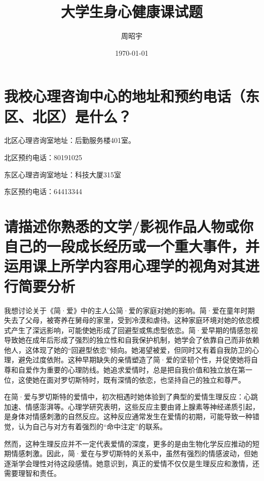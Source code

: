 \documentclass{ctexart}
\begin{document}
\title{大学生身心健康课试题}
\author{周昭宇}
\date{\today}

\pagestyle{empty}

\begin{titlepage}
    \maketitle
\end{titlepage}

\tableofcontents

\newpage

\section{我校心理咨询中心的地址和预约电话（东区、北区）是什么？}
北区心理咨询室地址：后勤服务楼401室。\par
北区预约电话：80191025\par
东区心理咨询室地址：科技大厦315室\par
东区预约电话：64413344\par

\section{请描述你熟悉的文学/影视作品人物或你自己的一段成长经历或一个重大事件，并运用课上所学内容用心理学的视角对其进行简要分析}
我想讨论关于《简·爱》中的主人公简·爱的家庭对她的影响。简·爱在童年时期失去了父母，被寄养在舅母的家里，受到冷漠和虐待。这种家庭环境对她的依恋模式产生了深远影响，可能使她形成了回避型或焦虑型依恋。简·爱早期的情感忽视导致她在成年后形成了强烈的独立性和自我保护机制，她学会了依靠自己而非依赖他人，这体现了她的“回避型依恋”倾向。她渴望被爱，但同时又有着自我防卫的心理，避免过度依附。这种早期缺失的亲情塑造了简·爱的坚韧个性，并促使她将自尊和自爱作为重要的心理防线。她追求爱情时，总是把自我价值和独立放在第一位，这使她在面对罗切斯特时，既有深情的依恋，也坚持自己的独立和尊严。\par
在简·爱与罗切斯特的爱情中，初次相遇时她体验到了典型的爱情生理反应：心跳加速、情感澎湃等。心理学研究表明，这些反应主要由肾上腺素等神经递质引起，是身体对情感刺激的自然反应。这种反应通常发生在爱情的初期，可能导致一种错觉，认为自己与对方有着强烈的“命中注定”的联系。

然而，这种生理反应并不一定代表爱情的深度，更多的是由生物化学反应推动的短期情感刺激。因此，简·爱在与罗切斯特的关系中，虽然有强烈的情感波动，但她逐渐学会理性对待这段感情。她意识到，真正的爱情不仅仅是生理反应和激情，还需要理智和责任。
\end{document}
